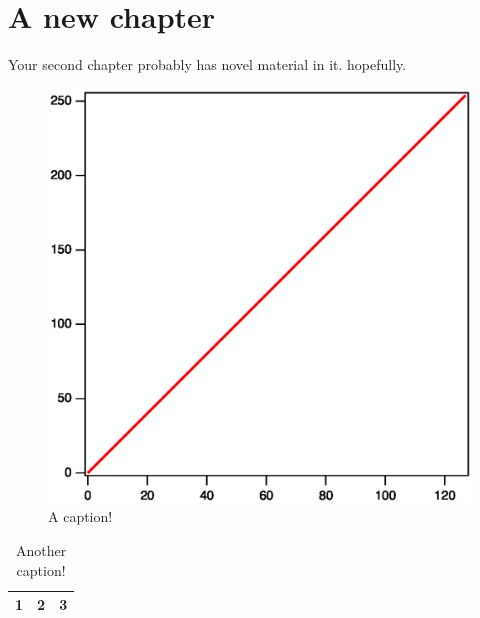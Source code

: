 \chapter{A new chapter}
Your second chapter probably has novel material in it. hopefully.





\begin{figure}[ht]
\centering
\includegraphics[width=.45\textwidth]{name_of_figure.eps}
\caption{A caption! \label{a_figure}}
\end{figure}

\begin{table}
\centering
\begin{tabular}{c|c|c}
 1 & 2 & 3 \\
\hline
\end{tabular}
\caption{Another caption! \label{a_table}}
\end{table}
